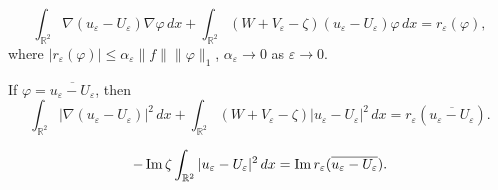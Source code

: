 \documentclass[graybox]{svmult}
\renewcommand{\Im}{\mathop{\rm Im}}
\newcommand{\Real}{\mathbb R}
\newcommand{\eps}{\varepsilon}
\renewcommand{\phi}{\varphi}
\renewcommand{\leq}{\leqslant}
\begin{document}
$$
\int_{\Real^2}\nabla (u_\eps-U_\eps) \nabla \phi\,dx+
             \int_{\Real^2} (W+V_\eps-\zeta)(u_\eps-U_\eps) \phi\,dx=r_\eps(\phi),
$$
where $|r_\eps(\phi)|\leq \alpha_\eps\|f\| \|\phi\|_1$, $\alpha_\eps\to 0$ as $\eps\to 0$.

If $\phi=\overline{u_\eps-U_\eps}$, then
$$
\int_{\Real^2}|\nabla (u_\eps-U_\eps)|^2\,dx+
             \int_{\Real^2} (W+V_\eps-\zeta)|u_\eps-U_\eps|^2\,dx=r_\eps(\overline{u_\eps-U_\eps}).
$$

$$
-\Im \zeta \int_{\Real^2}|u_\eps-U_\eps|^2\,dx=\Im r_\eps(\overline{u_\eps-U_\eps}).
$$
















\newpage

\end{document}
